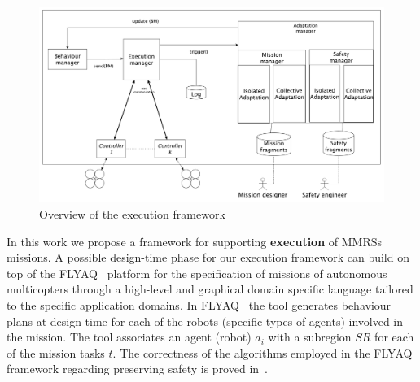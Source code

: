 \documentclass[journal]{IEEEtran}
\theoremstyle{definition}
\newcommand\patrizio[1]{\nb{Patrizio}{#1}}
\begin{document}
\begin{figure}[h]
\includegraphics[width=.5\textwidth]{Figures/overall_final.pdf}
\caption{Overview of the execution framework}\label{overall}
\end{figure}






In this work we propose a framework for supporting \textbf{execution} of MMRSs missions. A possible design-time phase for our execution framework can build on top of
the FLYAQ~\cite{bozhinoski2015flyaq, di2013engineering} platform for the specification of missions of autonomous multicopters through a high-level and graphical domain specific language tailored to the specific application
domains. In FLYAQ~\cite{bozhinoski2015flyaq, di2013engineering} the tool generates behaviour plans at design-time for each of the robots (specific types of agents) involved in the mission. The tool associates an agent (robot) $a_i$ with a subregion $SR$ for each of the mission tasks $t$. The correctness of the algorithms employed in the FLYAQ framework regarding preserving safety is proved in~\cite{ruscio2016automatic}.
\end{document}
